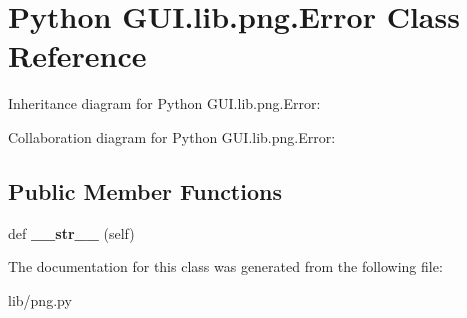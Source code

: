 \hypertarget{class_python_01_g_u_i_1_1lib_1_1png_1_1_error}{}\section{Python G\+U\+I.\+lib.\+png.\+Error Class Reference}
\label{class_python_01_g_u_i_1_1lib_1_1png_1_1_error}


Inheritance diagram for Python G\+U\+I.\+lib.\+png.\+Error\+:


Collaboration diagram for Python G\+U\+I.\+lib.\+png.\+Error\+:
\subsection*{Public Member Functions}
\begin{DoxyCompactItemize}
\item 
\mbox{\label{class_python_01_g_u_i_1_1lib_1_1png_1_1_error_aa7d39be9e86a04ec5d2c774e69650b96}} 
def {\bfseries \+\_\+\+\_\+str\+\_\+\+\_\+} (self)
\end{DoxyCompactItemize}


The documentation for this class was generated from the following file\+:\begin{DoxyCompactItemize}
\item 
lib/png.\+py\end{DoxyCompactItemize}
